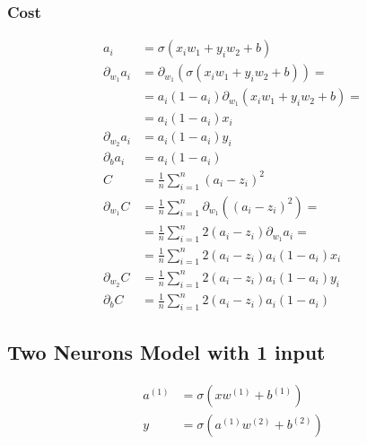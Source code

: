 \documentclass{article}
\begin{document}
\subsubsection{Cost}

\def\pd[#1]{\partial_{#1}}
\def\avgsum[#1,#2]{\frac{1}{#2}\sum_{#1=1}^{#2}}
\begin{align}
  a_i &= \sigma(x_iw_1 + y_iw_2 + b) \\
  \pd[w_1]a_i
      &= \pd[w_1](\sigma(x_iw_1 + y_iw_2 + b)) = \\
      &= a_i(1 - a_i)\pd[w_1](x_iw_1 + y_iw_2 + b) = \\
      &= a_i(1 - a_i)x_i \\
  \pd[w_2]a_i &= a_i(1 - a_i)y_i \\
  \pd[b]a_i &= a_i(1 - a_i) \\
  C &= \avgsum[i, n](a_i - z_i)^2 \\
  \pd[w_1] C
      &= \avgsum[i, n]\pd[w_1]\left((a_i - z_i)^2\right) = \\
      &= \avgsum[i, n]2(a_i - z_i)\pd[w_1]a_i = \\
      &= \avgsum[i, n]2(a_i - z_i)a_i(1 - a_i)x_i \\
  \pd[w_2] C &= \avgsum[i, n]2(a_i - z_i)a_i(1 - a_i)y_i \\
  \pd[b] C &= \avgsum[i, n]2(a_i - z_i)a_i(1 - a_i)
\end{align}

\subsection{Two Neurons Model with 1 input}

\begin{center}
\end{center}

\begin{align}
  a^{(1)} &= \sigma(xw^{(1)} + b^{(1)}) \\
  y &= \sigma(a^{(1)}w^{(2)} + b^{(2)})
\end{align}
\end{document}
